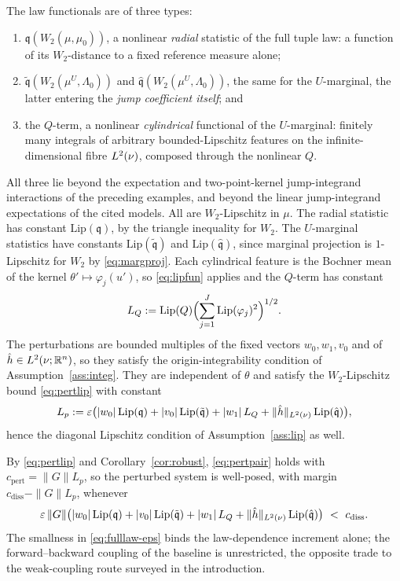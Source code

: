 \begin{example}
The law functionals are of three types:
\begin{enumerate}[label=(\roman*)]
\item $\mathfrak q(W_2(\mu,\mu_0))$, a nonlinear \emph{radial} statistic of the full tuple law:
  a function of its $W_2$-distance to a fixed reference measure alone;
\item $\tilde{\mathfrak q}(W_2(\mu^U,\Lambda_0))$ and $\hat{\mathfrak q}(W_2(\mu^U,\Lambda_0))$, the same for the
  $U$-marginal, the latter entering the \emph{jump coefficient itself}; and
\item the $Q$-term, a nonlinear \emph{cylindrical} functional of the $U$-marginal: finitely
  many integrals of arbitrary bounded-Lipschitz features on the infinite-dimensional fibre
  $L^2(\nu)$, composed through the nonlinear $Q$.
\end{enumerate}
All three lie beyond the expectation and two-point-kernel jump-integrand interactions of the
preceding examples, and beyond the linear jump-integrand expectations of the cited models. All
are $W_2$-Lipschitz in $\mu$. The radial statistic has constant $\mathrm{Lip}(\mathfrak q)$, by the
triangle inequality for $W_2$. The $U$-marginal statistics have constants
$\mathrm{Lip}(\tilde{\mathfrak q})$ and $\mathrm{Lip}(\hat{\mathfrak q})$, since marginal projection is
$1$-Lipschitz for $W_2$ by \eqref{eq:margproj}. Each cylindrical feature is the Bochner mean of
the kernel $\theta'\mapsto\varphi_j(u')$, so \eqref{eq:lipfun} applies and the $Q$-term has
constant
\[
L_Q:=\mathrm{Lip}(Q)\Bigl(\sum_{j=1}^J\mathrm{Lip}(\varphi_j)^2\Bigr)^{1/2} .
\]
The perturbations are bounded multiples of the fixed vectors $w_0,w_1,v_0$ and of
$\hat h\in L^2(\nu;\mathbb{R}^n)$, so they satisfy the origin-integrability condition of
Assumption~\ref{ass:integ}.
They are independent of $\theta$ and satisfy the $W_2$-Lipschitz bound \eqref{eq:pertlip}
with constant
\[
L_p:=\varepsilon\bigl(|w_0|\,\mathrm{Lip}(\mathfrak q)+|v_0|\,\mathrm{Lip}(\tilde{\mathfrak q})+|w_1|\,L_Q
+\lVert \hat h\rVert_{L^2(\nu)}\,\mathrm{Lip}(\hat{\mathfrak q})\bigr) ,
\]
hence the diagonal Lipschitz condition of Assumption~\ref{ass:lip} as well.

By \eqref{eq:pertlip} and Corollary~\ref{cor:robust}, \eqref{eq:pertpair} holds with
$c_{\mathrm{pert}}=\|G\|L_p$, so the perturbed system is well-posed, with margin
$c_{\mathrm{diss}}-\|G\|L_p$, whenever
\begin{equation}\label{eq:fulllaw-eps}
\varepsilon\,\|G\|\bigl(|w_0|\,\mathrm{Lip}(\mathfrak q)+|v_0|\,\mathrm{Lip}(\tilde{\mathfrak q})+|w_1|\,L_Q
+\Lnorm{\hat h}\,\mathrm{Lip}(\hat{\mathfrak q})\bigr)\ <\ c_{\mathrm{diss}} .
\end{equation}
The smallness in \eqref{eq:fulllaw-eps} binds the law-dependence increment alone; the
forward--backward coupling of the baseline is unrestricted, the opposite trade to the
weak-coupling route surveyed in the introduction.
\end{example}

